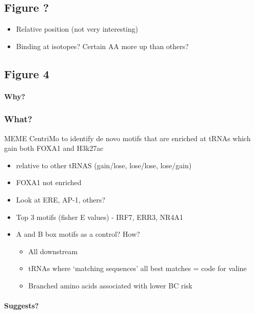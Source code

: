 \documentclass[
  11pt,
]{article}
\begin{document}
\hypertarget{figure}{%
\subsection{Figure ?}\label{figure}}

\begin{itemize}
\item
  Relative position (not very interesting)
\item
  Binding at isotopes?
  Certain AA more up than others?
\end{itemize}

\hypertarget{figure-4}{%
\subsection{Figure 4}\label{figure-4}}

\hypertarget{why-1}{%
\paragraph{Why?}\label{why-1}}

\hypertarget{what}{%
\subsubsection{What?}\label{what}}

MEME CentriMo to identify de novo motifs that are enriched at tRNAs which gain both FOXA1 and H3k27ac

\begin{itemize}
\item
  relative to other tRNAS (gain/lose, lose/lose, lose/gain)
\item
  FOXA1 not enriched
\item
  Look at ERE, AP-1, others?
\item
  Top 3 motifs (fisher E values) - IRF7, ERR3, NR4A1
\item
  A and B box motifs as a control?
  How?

  \begin{itemize}
  \item
    All downstream
  \item
    tRNAs where `matching sequences' all best matches = code for valine
  \item
    Branched amino acids associated with lower BC risk
  \end{itemize}
\end{itemize}

\hypertarget{suggests}{%
\paragraph{Suggests?}\label{suggests}}
\end{document}
